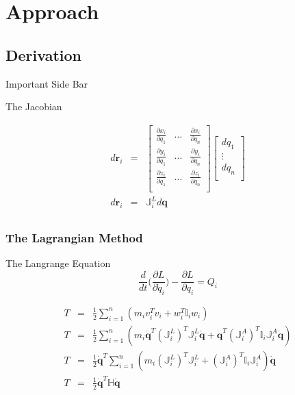 \documentclass{beamer}
\begin{document}
\section{Approach}
\subsection{Derivation}
\begin{frame}{Important Side Bar}

\begin{block}{The Jacobian}

\begin{eqnarray*}
d\textbf{r}_i & = & \begin{bmatrix}
		\frac{\partial x_i}{\partial q_1} & \dots & \frac{\partial x_i}{\partial q_n}\\
        \frac{\partial y_i}{\partial q_1} & \dots & \frac{\partial y_i}{\partial q_n}\\
        \frac{\partial z_i}{\partial q_1} & \dots & \frac{\partial z_i}{\partial q_n}\\
        \end{bmatrix} 
        \begin{bmatrix}
        dq_1\\
        \vdots\\
        dq_n\\
        \end{bmatrix}\\
d\textbf{r}_i & = & \mathbb{J}_i^L d\textbf{q}\\
\end{eqnarray*} 
\end{block}

\end{frame}

\begin{frame}\frametitle{The Lagrangian Method}
\begin{exampleblock}{The Langrange Equation}
\[
\frac{d}{dt} \Big( \frac{\partial L}{\partial \dot{q}_i} \Big) - \frac{\partial L}{\partial q_i} = Q_i
\]
\end{exampleblock}
\small
\begin{eqnarray*}
T & = & \frac{1}{2} \sum_{i=1}^{n} (m_i v_i^T v_i + w_i^T \mathbb{I}_i w_i)\\
T & = & \frac{1}{2} \sum_{i=1}^{n} (m_i \dot{\textbf{q}}^T (\mathbb{J}_i^L)^T \mathbb{J}_i^L \dot{\textbf{q}} + \dot{\textbf{q}}^T (\mathbb{J}_i^A)^T \mathbb{I}_i \mathbb{J}_i^A \dot{\textbf{q}})\\
T & = & \frac{1}{2} \dot{\textbf{q}}^T \sum_{i=1}^{n} (m_i  (\mathbb{J}_i^L)^T \mathbb{J}_i^L  +(\mathbb{J}_i^A)^T \mathbb{I}_i \mathbb{J}_i^A) \dot{\textbf{q}}\\
T & = & \frac{1}{2} \dot{\textbf{q}}^T \mathbb{H} \dot{\textbf{q}}\\
\end{eqnarray*}
\end{frame}
\end{document}
